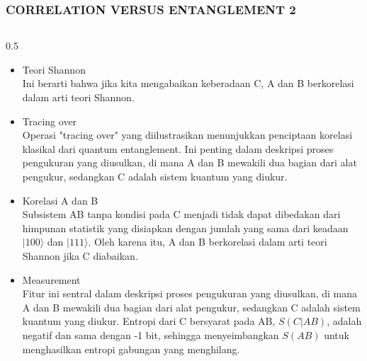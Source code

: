 \begin{frame}
    \frametitle{CORRELATION VERSUS ENTANGLEMENT 2}
       \vspace*{-0.5cm}
  \begin{columns}[T]
  \small
    \begin{column}{0.5\textwidth}
        \begin{itemize}  \tiny \justifying
            \item[$\Rightarrow$] Teori Shannon\\
                Ini berarti bahwa jika kita mengabaikan keberadaan C, A dan B berkorelasi dalam arti teori Shannon.
            \item[$\Rightarrow$] Tracing over\\
                Operasi "tracing over" yang diilustrasikan menunjukkan penciptaan korelasi klasikal dari quantum entanglement. Ini penting dalam deskripsi proses pengukuran yang diusulkan, di mana A dan B mewakili dua bagian dari alat pengukur, sedangkan C adalah sistem kuantum yang diukur.
            \item[$\Rightarrow$] Korelasi A dan B\\
                Subsistem AB tanpa kondisi pada C menjadi tidak dapat dibedakan dari himpunan statistik yang disiapkan dengan jumlah yang sama dari keadaan \(|100\rangle\) dan \(|111\rangle\). Oleh karena itu, A dan B berkorelasi dalam arti teori Shannon jika C diabaikan.
            \item[$\Rightarrow$] Measurement\\
                Fitur ini sentral dalam deskripsi proses pengukuran yang diusulkan, di mana A dan B mewakili dua bagian dari alat pengukur, sedangkan C adalah sistem kuantum yang diukur. Entropi dari C bersyarat pada AB, \(S(C|AB)\), adalah negatif dan sama dengan -1 bit, sehingga menyeimbangkan \(S(AB)\) untuk menghasilkan entropi gabungan yang menghilang.
        \end{itemize}
    \end{column}


\end{columns}
\end{frame}
